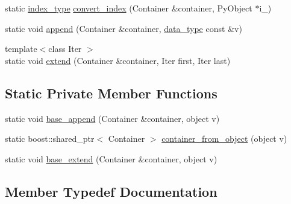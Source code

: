 \begin{DoxyCompactItemize}
\item 
static \hyperlink{classboost_1_1python_1_1std__vector__indexing__suite_a3124827b535a08798fbd33b9fee7b668}{index\+\_\+type} \hyperlink{classboost_1_1python_1_1std__vector__indexing__suite_ae4228941b0d743b8cfd1362fe95a1795}{convert\+\_\+index} (Container \&container, Py\+Object $\ast$i\+\_\+)
\item 
static void \hyperlink{classboost_1_1python_1_1std__vector__indexing__suite_a317a62cce09e40822e7c376cd6afc7b4}{append} (Container \&container, \hyperlink{classboost_1_1python_1_1std__vector__indexing__suite_a9c3db9df25d6966c54154275377c94ce}{data\+\_\+type} const \&v)
\item 
{\footnotesize template$<$class Iter $>$ }\\static void \hyperlink{classboost_1_1python_1_1std__vector__indexing__suite_a1e7c971129b8f99b579fbe311ce378d6}{extend} (Container \&container, Iter first, Iter last)
\end{DoxyCompactItemize}
\subsection*{Static Private Member Functions}
\begin{DoxyCompactItemize}
\item 
static void \hyperlink{classboost_1_1python_1_1std__vector__indexing__suite_a0857a3ee7c2b30c2d4b3452c8d16665e}{base\+\_\+append} (Container \&container, object v)
\item 
static boost\+::shared\+\_\+ptr$<$ Container $>$ \hyperlink{classboost_1_1python_1_1std__vector__indexing__suite_a1860d96ad96a74166d03d433826a5249}{container\+\_\+from\+\_\+object} (object v)
\item 
static void \hyperlink{classboost_1_1python_1_1std__vector__indexing__suite_acac3b93b150b5101da9b16e961ea4f09}{base\+\_\+extend} (Container \&container, object v)
\end{DoxyCompactItemize}


\subsection{Member Typedef Documentation}
\hypertarget{classboost_1_1python_1_1std__vector__indexing__suite_a9c3db9df25d6966c54154275377c94ce}{}
